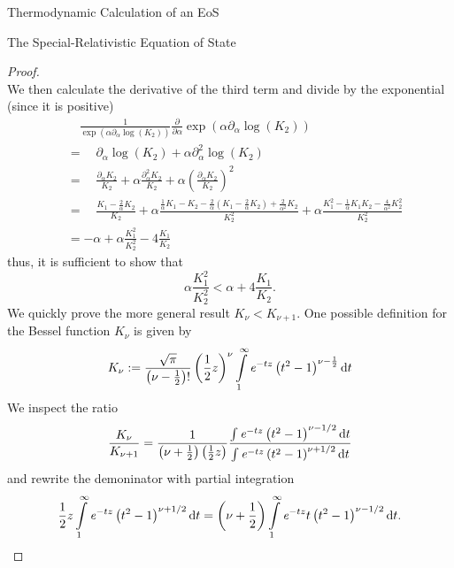 \begin{section}{Thermodynamic Calculation of an EoS}
\begin{subsection}{The Special-Relativistic Equation of State}
\begin{proof}
\begin{equation}
		\label{2-IntEner-BesselDerivative}
	\end{equation}
	We then calculate the derivative of the third term and divide by the exponential (since it is positive)
	\begin{align}
		&\hspace{1em} \frac{1}{\exp(\alpha\partial_\alpha\log(K_2))}\frac{\partial}{\partial\alpha}\exp(\alpha\partial_\alpha\log(K_2))\\
		&= \hspace{1em} \partial_\alpha\log(K_2) + \alpha\partial^2_\alpha\log(K_2)\\
		&= \hspace{1em} \frac{\partial_\alpha K_2}{K_2} + \alpha\frac{\partial^2_\alpha K_2}{K_2} + \alpha\left(\frac{\partial_\alpha K_2}{K_2}\right)^2\\
		&= \hspace{1em} \frac{K_1-\frac{2}{\alpha}K_2}{K_2} + \alpha\frac{\frac{1}{\alpha}K_1-K_2-\frac{2}{\alpha}\left(K_1-\frac{2}{\alpha}K_2\right)+\frac{2}{\alpha^2}K_2}{K_2^2} + \alpha\frac{K_1^2-\frac{1}{\alpha}K_1K_2-\frac{4}{\alpha^2}K_2^2}{K_2^2}\\
		&= -\alpha + \alpha\frac{K_1^2}{K_2^2} - 4\frac{K_1}{K_2}
	\end{align}
	thus, it is sufficient to show that
	\begin{equation}
		\alpha\frac{K_1^2}{K_2^2}  < \alpha + 4\frac{K_1}{K_2}.
	\end{equation}
	We quickly prove the more general result $K_\nu<K_{\nu+1}$.
	One possible definition \cite{abramowitzPocketbookMathematicalFunctions1984} for the Bessel function $K_\nu$ is given by
	\begin{equation}
		K_\nu := \frac{\sqrt{\pi}}{\left(\nu-\frac{1}{2}\right)!}\left(\frac{1}{2}z\right)^\nu\int\limits_1^\infty\mathit{e}^{-tz}\left(t^2-1\right)^{\nu-\frac{1}{2}}\mathop{}\!\mathrm{d} t
	\end{equation}
	We inspect the ratio
	\begin{equation}
		\frac{K_\nu}{K_{\nu+1}} = \frac{1}{\left(\nu+\frac{1}{2}\right)\left(\frac{1}{2}z\right)}\frac{\int\mathit{e}^{-tz}\left(t^2-1\right)^{\nu-1/2}\mathop{}\!\mathrm{d} t}{\int\mathit{e}^{-tz}\left(t^2-1\right)^{\nu+1/2}\mathop{}\!\mathrm{d} t}
	\end{equation}
	and rewrite the demoninator with partial integration
	\begin{equation}
		 \frac{1}{2}z\int\limits_1^\infty\mathit{e}^{-tz}\left(t^2-1\right)^{\nu+1/2}\mathop{}\!\mathrm{d} t = \left(\nu+\frac{1}{2}\right)\int\limits_1^\infty \mathit{e}^{-tz}t\left(t^2-1\right)^{\nu-1/2}\mathop{}\!\mathrm{d} t.
	\end{equation}

\end{proof}
\end{subsection}
\end{section}
